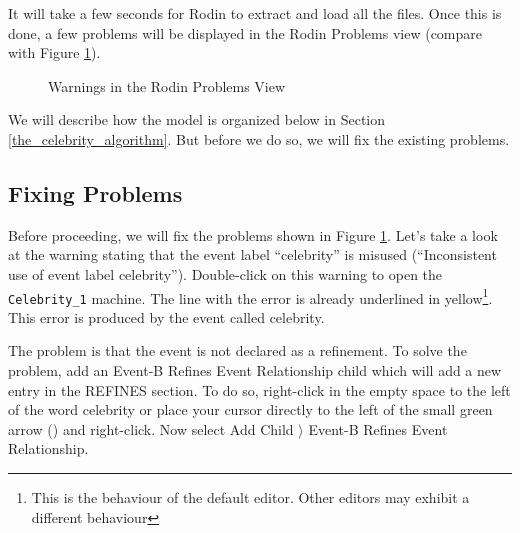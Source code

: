 It will take a few seconds for Rodin to extract and load all the files. Once this is done, a few problems will be displayed in the Rodin Problems view (compare with Figure \ref{fig_tut_08_rodin_problemview}).

\begin{figure}[!ht]
\begin{center}
	\caption{Warnings in the Rodin Problems View}
	\label{fig_tut_08_rodin_problemview}
\end{center}
\end{figure}

We will describe how the model is organized below in Section \ref{the_celebrity_algorithm}.  But before we do so, we will fix the existing problems.

\subsection{Fixing Problems}
\label{tut_celebrity_fixing problems}

Before proceeding, we will fix the problems shown in Figure \ref{fig_tut_08_rodin_problemview}. Let's take a look at the warning stating that the event label ``celebrity'' is misused (``Inconsistent use of event label celebrity''). Double-click on this warning to open the \texttt{Celebrity\_1} machine. The line with the error is already underlined in yellow\footnote{This is the behaviour of the default editor.  Other editors may exhibit a different behaviour}. This error is produced by the event called \textsf{celebrity}.

The problem is that the event is not declared as a refinement. To solve the problem, add an \textsf{Event-B Refines Event Relationship} child which will add a new entry in the \textsf{REFINES} section.  To do so, right-click in the empty space to the left of the word \textsf{celebrity} or place your cursor directly to the left of the small green arrow () and right-click. Now select \textsf{Add Child $\rangle$ Event-B Refines Event Relationship}.


